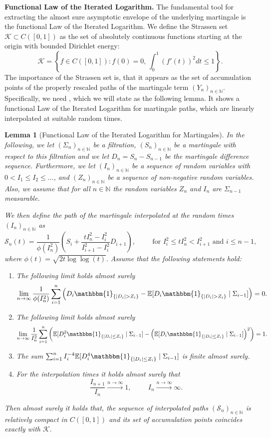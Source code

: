 \documentclass[11pt]{article}
\newtheorem{lemma}{Lemma}[section]
\theoremstyle{remark}
\newcommand{\N}{\mathbb{N}}
\begin{document}
\textbf{Functional Law of the Iterated Logarithm.} The fundamental tool for extracting the almost sure asymptotic envelope of the underlying martingale is the functional Law of the Iterated Logarithm. We define the Strassen set $\mathcal{K} \subset C([0,1])$ as the set of absolutely continuous functions starting at the origin with bounded Dirichlet energy:
$$\mathcal{K} = \left\{ f \in C([0,1]) : f(0)=0, \, \int_0^1 (f'(t))^2 dt \leq 1 \right\}.$$
The importance of the Strassen set is, that it appears as the set of accumulation points of the properly rescaled paths of the martingale term $(Y_n)_{n\in\N}$. Specifically, we need \cite[Theorem 4.7.]{HH80}, which we will state as the following lemma. It shows a functional Law of the Iterated Logarithm for martingale paths, which are linearly interpolated at suitable random times.
\begin{lemma}[Functional Law of the Iterated Logarithm for Martingales]\label{lem:martingale-LIL}
    In the following, we let $(\Sigma_n)_{n\in\N}$ be a filtration, $(S_n)_{n\in\N}$ be a martingale with respect to this filtration and we let $D_n=S_n-S_{n-1}$ be the martingale difference sequence. Furthermore, we let $(I_n)_{n\in\N}$ be a sequence of random variables with $0<I_1\leq I_2\leq\ldots$, and $(Z_n)_{n\in\N}$ be a sequence of non-negative random variables. Also, we assume that for all $n\in\N$ the random variables $Z_n$ and $I_n$ are $\Sigma_{n-1}$ measurable.

    We then define the path of the martingale interpolated at the random times $(I_n)_{n\in\N}$ as
    $$\mathcal{S}_n(t)=\frac{1}{\phi(I_n^2)}\left(S_i+\frac{tI_n^2-I_i^2}{I_{i+1}^2-I_i^2}D_{i+1}\right),\hspace{1cm}\text{for }I_i^2\leq tI_n^2<I_{i+1}^2\text{ and }i\leq n-1,$$
    where $\phi(t)=\sqrt{2t\log\log(t)}.$ Assume that the following statements hold:
    \begin{enumerate}
        \item The following limit holds almost surely 
        $$\lim_{n\rightarrow\infty}\frac{1}{\phi(I_n^2)}\sum_{i=1}^n\left(D_i\mathbbm{1}_{\{|D_i|>Z_i\}}-\mathbb{E}[D_i\mathbbm{1}_{\{|D_i|>Z_i\}}\;|\;\Sigma_{i-1}]\right)=0.$$
        \item The following limit holds almost surely
        $$\lim_{n\rightarrow\infty}\frac{1}{I_n^2}\sum_{i=1}^n\left(\mathbb{E}[D_i^2\mathbbm{1}_{\{|D_i|\leq Z_i\}}\;|\;\Sigma_{i-1}]-\left(\mathbb{E}[D_i\mathbbm{1}_{\{|D_i|\leq Z_i\}}\;|\;\Sigma_{i-1}]\right)^2\right)=1.$$
        \item The sum $\sum_{i=1}^n I_i^{-4}\mathbb{E}[D_i^4\mathbbm{1}_{\{|D_i|\leq Z_i\}}\;|\;\Sigma_{i-1}]$ is finite almost surely.
        \item For the interpolation times it holds almost surely that
        $$\frac{I_{n+1}}{I_n}\xrightarrow{n\rightarrow\infty}1,\hspace{1cm}I_n\xrightarrow{n\rightarrow\infty}\infty.$$
    \end{enumerate}
    Then almost surely it holds that, the sequence of interpolated paths $(\mathcal{S}_n)_{n\in\N}$ is relatively compact in $C([0,1])$ and its set of accumulation points coincides exactly with $\mathcal{K}.$
\end{lemma}
\end{document}
